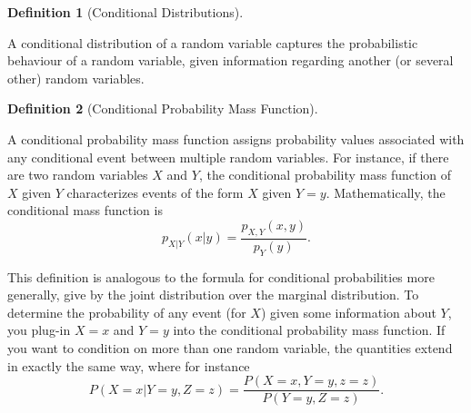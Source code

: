 \documentclass[
  letterpaper,
  DIV=11,
  numbers=noendperiod]{scrreprt}
\theoremstyle{definition}
\theoremstyle{definition}
\theoremstyle{definition}
\newtheorem{definition}{Definition}[chapter]
\theoremstyle{remark}
\begin{document}
\begin{definition}[Conditional
Distributions]\protect\hypertarget{def-conditional-distribution}{}\label{def-conditional-distribution}

A conditional distribution of a random variable captures the
probabilistic behaviour of a random variable, given information
regarding another (or several other) random variables.

\end{definition}

\begin{definition}[Conditional Probability Mass
Function]\protect\hypertarget{def-conditional-pmf}{}\label{def-conditional-pmf}

A conditional probability mass function assigns probability values
associated with any conditional event between multiple random variables.
For instance, if there are two random variables \(X\) and \(Y\), the
conditional probability mass function of \(X\) given \(Y\) characterizes
events of the form \(X\) given \(Y=y\). Mathematically, the conditional
mass function is \[p_{X|Y}(x|y) = \frac{p_{X,Y}(x,y)}{p_Y(y)}.\]

\end{definition}

This definition is analogous to the formula for conditional
probabilities more generally, give by the joint distribution over the
marginal distribution. To determine the probability of any event (for
\(X\)) given some information about \(Y\), you plug-in \(X=x\) and
\(Y=y\) into the conditional probability mass function. If you want to
condition on more than one random variable, the quantities extend in
exactly the same way, where for instance
\[P(X=x|Y=y,Z=z)=\frac{P(X=x,Y=y,z=z)}{P(Y=y,Z=z)}.\]
\end{document}
